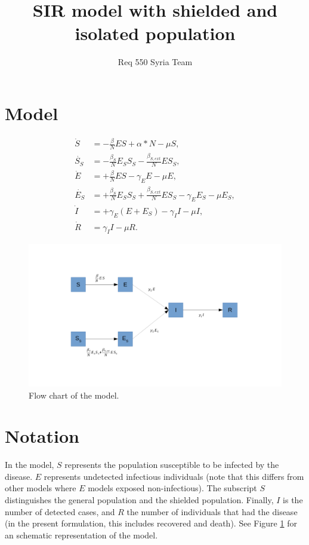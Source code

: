 \documentclass{article}
\title{SIR model with shielded and isolated population}
\author{Req 550 Syria Team}
\begin{document}
\maketitle 

\section{Model}

\begin{align}
    \dot{S} &= - \frac{\beta}{N} E S + \alpha*N -\mu S,\label{eqn:basicSEIR_S}\\
    \dot{S_S} &= - \frac{\beta_{S}}{N} E_S S_S -\frac{\beta_{S,ext}}{N} E S_S,\label{eqn:basicSEIR_SS}\\
    \dot{E} &=+ \frac{\beta}{N} E S-\gamma_{E}E - \mu E,\label{eqn:basicSEIR_E}\\
    \dot{E_S} &=+ \frac{\beta_{S}}{N} E_S S_S
                 +\frac{\beta_{S,ext}}{N} E S_S -\gamma_{E}E_S-\mu E_S,
                 \label{eqn:basicSEIR_ES}\\
    \dot{I} &= +\gamma_{E}(E+E_S)-\gamma_{I} I - \mu I, \label{eqn:basicSEIR_I}\\
    \dot{R} &= \gamma_{I} I - \mu R. \label{eqn:basicSEIR_R}
\end{align}

\begin{figure}[ht]
    \includegraphics[width=.95\linewidth]{seir_shielded_diagram}
    \caption{Flow chart of the model.}\label{fig:seir_diagram}
\end{figure}


\section{Notation}

In the model, $S$ represents the population susceptible to be infected by the
disease. $E$ represents undetected infectious individuals (note that this
differs from other models where $E$ models exposed non-infectious). The
subscript $S$ distinguishes the general population and the shielded population.
Finally, $I$ is the number of detected cases, and $R$ the number of individuals
that had the disease (in the present formulation, this includes recovered and
death). See Figure \ref{fig:seir_diagram} for an schematic representation of
the model.
\end{document}
